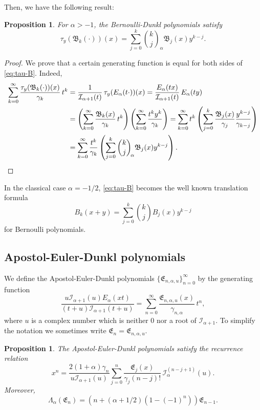 \documentclass[10pt,a4paper]{article}
\theoremstyle{plain}
\newtheorem{proposition}[theorem]{Proposition}
\theoremstyle{definition}
\numberwithin{equation}{section} %
\newcommand{\Ea}{E_{\alpha}}
\newcommand{\La}{\Lambda_{\alpha}}
\newcommand{\I}{\mathcal{I}}
\newcommand{\B}{\mathfrak{B}}
\newcommand{\E}{\mathfrak{E}}
\newcommand{\cc}{\gamma}
\begin{document}
Then, we have the following result:

\begin{proposition}
For $\alpha>-1$, the Bernoulli-Dunkl polynomials satisfy
\begin{equation}
\label{eq:tau-B}
  \tau_y(\B_k(\cdot))(x)
  = \sum_{j=0}^k \binom{k}{j}_{\!\alpha} \B_j(x) y^{k-j}.
\end{equation}
\end{proposition}

\begin{proof}
We prove that a certain generating function is equal for both sides of \eqref{eq:tau-B}. Indeed,
\begin{align*}
  \sum_{k=0}^\infty \frac{\tau_y(\B_k(\cdot))(x)}{\cc_{k}} \, t^k
  &= \frac{1}{\I_{\alpha+1}(t)} \, \tau_y(E_{\alpha}(t\cdot))(x)
  = \frac{E_\alpha(tx)}{\I_{\alpha+1}(t)} \, E_\alpha(ty) \\
  &= \left(\sum_{k=0}^\infty \frac{\B_k(x)}{\cc_{k}} \, t^k\right)
  \left(\sum_{k=0}^\infty \frac{t^k y^k}{\cc_{k}}\right)
  = \sum_{k=0}^\infty t^k \left(\sum_{j=0}^k
  \frac{\B_j(x)}{\cc_{j}} \frac{y^{k-j}}{\cc_{k-j}}\right) \\
  &= \sum_{k=0}^\infty \frac{t^k}{\cc_{k}}
  \left(\sum_{j=0}^k \binom{k}{j}_{\!\alpha} \B_j(x)y^{k-j}\right).
\qedhere
\end{align*}
\end{proof}

In the classical case $\alpha=-1/2$, \eqref{eq:tau-B} becomes the well known translation formula
\[
  B_k(x+y) = \sum_{j=0}^k \binom{k}{j} B_j(x)y^{k-j}
\]
for Bernoulli polynomials.

\subsection{Apostol-Euler-Dunkl polynomials}

We define the Apostol-Euler-Dunkl polynomials $\{\E_{n,\alpha,u}\}_{n=0}^{\infty}$ by the generating function
\begin{equation}
\label{eq:defaed}
  \frac{u\I_{\alpha+1}(u)\Ea(xt)}{(t+u)\I_{\alpha+1}(t+u)}
 = \sum_{n=0}^\infty \frac{\E_{n,\alpha,u}(x)}{\cc_{n,\alpha}} \,t^n,
\end{equation}
where $u$ is a complex number which is neither $0$ nor a root of $\I_{\alpha+1}$.
To simplify the notation we sometimes write $\E_n=\E_{n,\alpha,u}$.

\begin{proposition}
The Apostol-Euler-Dunkl polynomials satisfy the recurrence relation
\begin{equation}
\label{eq:xned}
  x^{n} = \frac{2(1+\alpha)\cc_n}{u\I_{\alpha+1}(u)}
    \sum_{j=0}^{n} \frac{\E_{j}(x)}{\cc_j(n-j)!} \, \I_{\alpha}^{(n-j+1)}(u).
\end{equation}
Moreover,
\[
  \La(\E_n) = (n+(\alpha+1/2)(1-(-1)^n))\E_{n-1}.
\]
\end{proposition}
\end{document}
